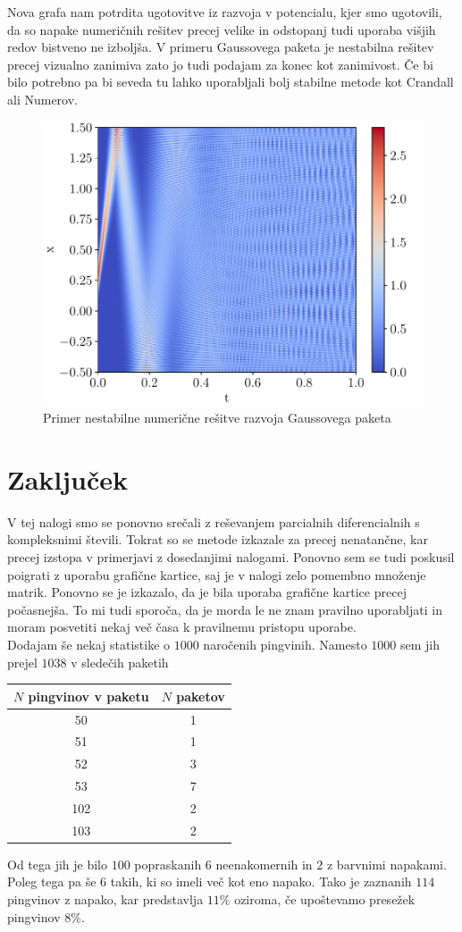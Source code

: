 \documentclass{article}
\begin{document}
Nova grafa nam potrdita ugotovitve iz razvoja v potencialu, kjer smo ugotovili, da so napake numeričnih rešitev precej velike in odstopanj tudi uporaba višjih redov bistveno ne izboljša. V primeru Gaussovega paketa je nestabilna rešitev precej vizualno zanimiva zato jo tudi podajam za konec kot zanimivost. Če bi bilo potrebno pa bi seveda tu lahko uporabljali bolj stabilne metode kot Crandall ali Numerov.
\begin{figure}[H]
	\centering
	\includegraphics[width=0.7\linewidth]{nonstable.pdf}
	\caption{Primer nestabilne numerične rešitve razvoja Gaussovega paketa}
\end{figure}
\section{Zaključek}
V tej nalogi smo se ponovno srečali z reševanjem parcialnih diferencialnih s kompleksnimi števili. Tokrat so se metode izkazale za precej nenatančne, kar precej izstopa v primerjavi z dosedanjimi nalogami. Ponovno sem se tudi poskusil poigrati z uporabu grafične kartice, saj je v nalogi zelo pomembno množenje matrik. Ponovno se je izkazalo, da je bila uporaba grafične kartice precej počasnejša. To mi tudi sporoča, da je morda le ne znam pravilno uporabljati in moram posvetiti nekaj več časa k pravilnemu pristopu uporabe.\\
Dodajam še nekaj statistike o $1000$ naročenih pingvinih. Namesto $1000$ sem jih prejel $1038$ v sledečih paketih
\begin{table}[H]
\centering
\begin{tabular}{|c|c|}
\hline
	$N$ pingvinov v paketu & $N$ paketov \\ \hline
	50 & 1 \\ \hline
	51 & 1 \\ \hline
	52 & 3 \\ \hline
	53 & 7 \\ \hline
	102 & 2 \\ \hline
	103 & 2 \\ \hline
\end{tabular}
\end{table}
Od tega jih je bilo $100$ popraskanih $6$ neenakomernih in $2$ z barvnimi napakami. Poleg tega pa še $6$ takih, ki so imeli več kot eno napako. Tako je zaznanih $114$ pingvinov z napako, kar predstavlja $11\%$ oziroma, če upoštevamo presežek pingvinov $8\%$.
\end{document}
